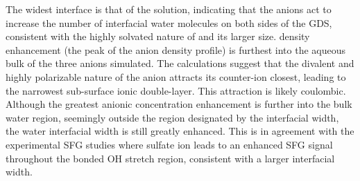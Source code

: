 
The widest interface is that of the \sodsul solution, indicating that the \sul anions act to increase the number of interfacial water molecules on both sides of the GDS, consistent with the highly solvated nature of \sul and its larger size. \sul density enhancement (the peak of the anion density profile) is furthest into the aqueous bulk of the three anions simulated. The calculations suggest that the divalent and highly polarizable nature of the \sul anion attracts its counter-ion closest, leading to the narrowest sub-surface ionic double-layer. This attraction is likely coulombic. Although the greatest anionic concentration enhancement is further into the bulk water region, seemingly outside the region designated by the interfacial width, the water interfacial width is still greatly enhanced. This is in agreement with the experimental \sodsul SFG studies where sulfate ion leads to an enhanced SFG signal throughout the bonded OH stretch region, consistent with a larger interfacial width.\cite{McFearin2009}


